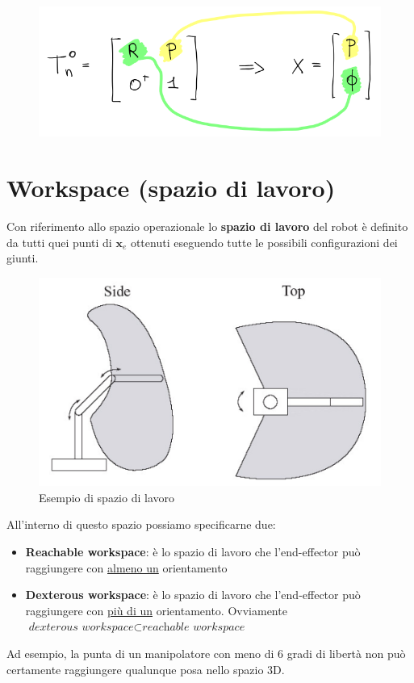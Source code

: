 \begin{figure}[!ht]
	\centering
	\includegraphics[width=0.6\linewidth]{images/kinematics_10}
	\caption{}
	\label{fig:kinematics10}
\end{figure}




\section{Workspace (spazio di lavoro)}
Con riferimento allo spazio operazionale lo \textbf{spazio di lavoro} del robot è definito da tutti quei punti di $\boldsymbol{x}_e$ ottenuti eseguendo tutte le possibili configurazioni dei giunti.
\begin{figure}[!bh]
	\centering
	\includegraphics[width=0.5\linewidth]{images/kinematics_11}
	\caption{Esempio di spazio di lavoro}
	\label{fig:kinematics11}
\end{figure}

All'interno di questo spazio possiamo specificarne due:
\begin{itemize}
	\item \textbf{Reachable workspace}: è lo spazio di lavoro che l'end-effector può raggiungere con \underline{almeno un} orientamento
	\item \textbf{Dexterous workspace}: è lo spazio di lavoro che l'end-effector può raggiungere con \underline{più di un} orientamento. Ovviamente $\textit{dexterous workspace} \subset \textit{reachable workspace}$
\end{itemize}

Ad esempio, la punta di un manipolatore con meno di 6 gradi di libertà non può certamente raggiungere qualunque posa nello spazio 3D.






